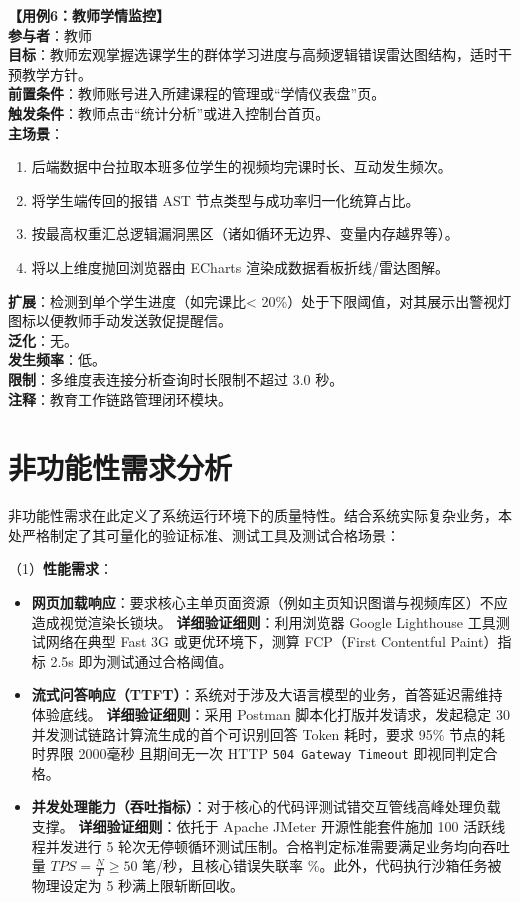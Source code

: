 \vspace{1em}
\noindent\textbf{【用例6：教师学情监控】}\\
\textbf{参与者}：教师\\
\textbf{目标}：教师宏观掌握选课学生的群体学习进度与高频逻辑错误雷达图结构，适时干预教学方针。\\
\textbf{前置条件}：教师账号进入所建课程的管理或“学情仪表盘”页。\\
\textbf{触发条件}：教师点击“统计分析”或进入控制台首页。\\
\textbf{主场景}：
\begin{enumerate}
    \item 后端数据中台拉取本班多位学生的视频均完课时长、互动发生频次。
    \item 将学生端传回的报错 AST 节点类型与成功率归一化统算占比。
    \item 按最高权重汇总逻辑漏洞黑区（诸如循环无边界、变量内存越界等）。
    \item 将以上维度抛回浏览器由 ECharts 渲染成数据看板折线/雷达图解。
\end{enumerate}
\textbf{扩展}：检测到单个学生进度（如完课比< 20\%）处于下限阈值，对其展示出警视灯图标以便教师手动发送敦促提醒信。\\
\textbf{泛化}：无。\\
\textbf{发生频率}：低。\\
\textbf{限制}：多维度表连接分析查询时长限制不超过 3.0 秒。\\
\textbf{注释}：教育工作链路管理闭环模块。


\section{非功能性需求分析}

非功能性需求在此定义了系统运行环境下的质量特性。结合系统实际复杂业务，本处严格制定了其可量化的验证标准、测试工具及测试合格场景：

（1）\textbf{性能需求}：
\begin{itemize}
    \item \textbf{网页加载响应}：要求核心主单页面资源（例如主页知识图谱与视频库区）不应造成视觉渲染长锁块。
    \textbf{详细验证细则}：利用浏览器 Google Lighthouse 工具测试网络在典型 Fast 3G 或更优环境下，测算 FCP（First Contentful Paint）指标 \le 2.5s 即为测试通过合格阈值。
    \item \textbf{流式问答响应（TTFT）}：系统对于涉及大语言模型的业务，首答延迟需维持体验底线。
    \textbf{详细验证细则}：采用 Postman 脚本化打版并发请求，发起稳定 30 并发测试链路计算流生成的首个可识别回答 Token 耗时，要求 95\% 节点的耗时界限 \le 2000毫秒 且期间无一次 HTTP \texttt{504 Gateway Timeout} 即视同判定合格。
    \item \textbf{并发处理能力（吞吐指标）}：对于核心的代码评测试错交互管线高峰处理负载支撑。
    \textbf{详细验证细则}：依托于 Apache JMeter 开源性能套件施加 100 活跃线程并发进行 5 轮次无停顿循环测试压制。合格判定标准需要满足业务均向吞吐量 $TPS = \frac{N}{T} \ge 50$ 笔/秒，且核心错误失联率 \%。此外，代码执行沙箱任务被物理设定为 5 秒满上限斩断回收。
\end{itemize}

